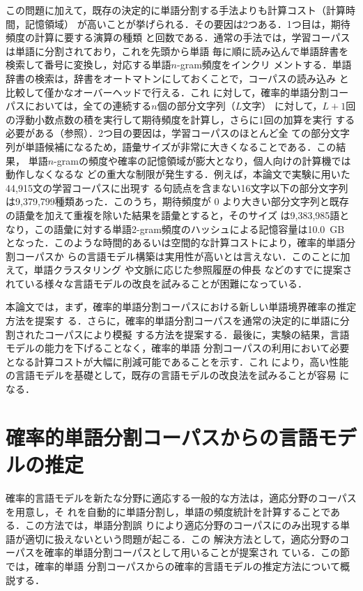 \documentclass[japanese]{jnlp_1.4}
\begin{document}
この問題に加えて，既存の決定的に単語分割する手法よりも計算コスト（計算時間，記憶領域）
が高いことが挙げられる．その要因は2つある．1つ目は，期待頻度の計算に要する演算の種類
と回数である．通常の手法では，学習コーパスは単語に分割されており，これを先頭から単語
毎に順に読み込んで単語辞書を検索して番号に変換し，対応する単語$n$-gram頻度をインクリ
メントする．単語辞書の検索は，辞書をオートマトンにしておくことで，コーパスの読み込み
と比較して僅かなオーバーヘッドで行える\cite{DFAによる形態素解析の高速辞書検索}．これ
に対して，確率的単語分割コーパスにおいては，全ての連続する$n$個の部分文字列（$L$文字）
に対して，$L+1$回の浮動小数点数の積を実行して期待頻度を計算し，さらに1回の加算を実行
する必要がある（参照）．2つ目の要因は，学習コーパスのほとんど全
ての部分文字列が単語候補になるため，語彙サイズが非常に大きくなることである．この結果，
単語$n$-gramの頻度や確率の記憶領域が膨大となり，個人向けの計算機では動作しなくなるな
どの重大な制限が発生する．例えば，本論文で実験に用いた44,915文の学習コーパスに出現す
る句読点を含まない16文字以下の部分文字列は9,379,799種類あった．このうち，期待頻度が
0 より大きい部分文字列と既存の語彙を加えて重複を除いた結果を語彙とすると，そのサイズ
は9,383,985語となり，この語彙に対する単語2-gram頻度のハッシュによる記憶容量は10.0~GB
となった．このような時間的あるいは空間的な計算コストにより，確率的単語分割コーパスか
らの言語モデル構築は実用性が高いとは言えない．このことに加えて，単語クラスタリング
\cite{Class-Based.n-gram.Models.of.Natural.Language}や文脈に応じた参照履歴の伸長
\cite{The.Power.of.Amnesia:.Learning.Probabilistic.Automata.with.Variable.Memory.Length}
などのすでに提案されている様々な言語モデルの改良を試みることが困難になっている．

本論文では，まず，確率的単語分割コーパスにおける新しい単語境界確率の推定方法を提案す
る．さらに，確率的単語分割コーパスを通常の決定的に単語に分割されたコーパスにより模擬
する方法を提案する．最後に，実験の結果，言語モデルの能力を下げることなく，確率的単語
分割コーパスの利用において必要となる計算コストが大幅に削減可能であることを示す．これ
により，高い性能の言語モデルを基礎として，既存の言語モデルの改良法を試みることが容易
になる．



\section{確率的単語分割コーパスからの言語モデルの推定}
\label{section:raw}

確率的言語モデルを新たな分野に適応する一般的な方法は，適応分野のコーパスを用意し，そ
れを自動的に単語分割し，単語の頻度統計を計算することである．この方法では，単語分割誤
りにより適応分野のコーパスにのみ出現する単語が適切に扱えないという問題が起こる．この
解決方法として，適応分野のコーパスを確率的単語分割コーパスとして用いることが提案され
ている\cite{確率的単語分割コーパスからの単語N-gram確率の計算}．この節では，確率的単語
分割コーパスからの確率的言語モデルの推定方法について概説する．
\end{document}
